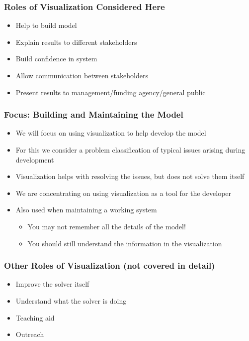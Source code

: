 \documentclass[dvipsnames,aspectratio=169]{beamer}
\begin{document}
\begin{frame}
\frametitle{Roles of Visualization Considered Here}
\begin{itemize}
\item Help to build model
\item Explain results to different stakeholders
\item Build confidence in system
\item Allow communication between stakeholders
\item Present results to management/funding agency/general public
\end{itemize}
\end{frame}

\begin{frame}
\frametitle{Focus: Building and Maintaining the Model}
\begin{itemize}
\item We will focus on using visualization to help develop the model
\item For this we consider a problem classification of typical issues arising during development
\item Visualization helps with resolving the issues, but does not solve them itself
\item We are concentrating on using visualization as a tool for the developer
\item Also used when maintaining a working system
\begin{itemize}
\item You may not remember all the details of the model!
\item You should still understand the information in the visualization
\end{itemize}
\end{itemize}
\end{frame}

\begin{frame}
\frametitle{Other Roles of Visualization (not covered in detail)}
\begin{itemize}
\item Improve the solver itself
\item Understand what the solver is doing
\item Teaching aid
\item Outreach
\end{itemize}
\end{frame}
\end{document}
